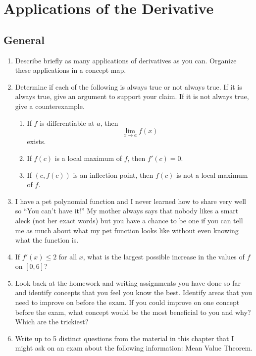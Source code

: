 \chapter{Applications of the Derivative}
\section{General}\begin{enumerate}

\item  Describe briefly as many applications of derivatives as you can.  Organize these applications in a concept map. 

\item  Determine if each of the following is always true or not always true.  If it is always true, give an argument to support your claim.  If it is not always true, give a counterexample.  
\begin{enumerate}
	\item 	If $f$ is differentiable at $a$, then $$\mathop {\lim }\limits_{x \to a} f(x)$$ exists.
	\item	If $f(c)$ is a local maximum of $f$, then $f'(c) = 0.$
	\item	If $(c, f(c))$ is an inflection point, then $f(c)$ is not a local maximum of $f$.  \cite{MR}
\end{enumerate}

\item  I have a pet polynomial function and I never learned how to share very well so ``You can't have it!''  My mother always says that nobody likes a smart aleck (not her exact words) but you have a chance to be one if you can tell me as much about what my pet function looks like without even knowing what the function is.

\item  If $f'\left( x \right) \le 2$ for all $x$, what is the largest possible increase in the values of $f$ on $[0, 6]$?

\item  Look back at the homework and writing assignments you have done so far and identify concepts that you feel you know the best.  Identify areas that you need to improve on before the exam.  If you could improve on one concept before the exam, what concept would be the most beneficial to you and why? Which are the trickiest?

\item  Write up to 5 distinct questions from the material in this chapter that I might ask on an exam about the following information: Mean Value Theorem.


\end{enumerate}
